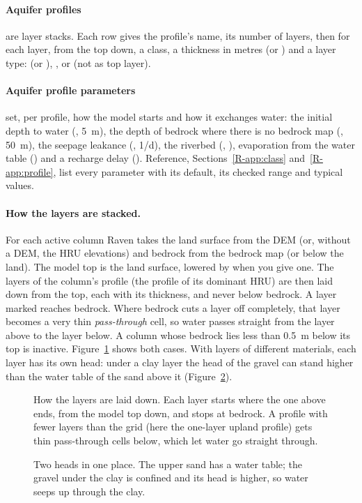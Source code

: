 \paragraph{Aquifer profiles} are layer stacks. Each row gives the profile's name, its number of layers, then for each
layer, from the top down, a class, a thickness in metres (or ) and a layer type:  (or
), ,  or  (not as top layer).

\paragraph{Aquifer profile parameters} set, per profile, how the model starts and how it exchanges water: the initial
depth to water (, 5~m), the depth of bedrock where there is no bedrock map
(, 50~m), the seepage leakance (, 1/d), the riverbed
(, ), evaporation from the water table () and a recharge
delay (). Reference, Sections~\ref{R-app:class} and~\ref{R-app:profile}, list every parameter
with its default, its checked range and typical values.

\paragraph{How the layers are stacked.} For each active column Raven takes the land surface from the DEM (or, without a
DEM, the HRU elevations) and bedrock from the bedrock map (or  below the land). The model top
is the land surface, lowered by  when you give one. The layers of the column's profile (the
profile of its dominant HRU) are then laid down from the top, each with its thickness, and never below bedrock. A layer
marked  reaches bedrock. Where bedrock cuts a layer off completely, that layer becomes a very thin
\emph{pass-through} cell, so water passes straight from the layer above to the layer below. A column whose bedrock lies
less than 0.5~m below its top is inactive.
Figure~\ref{fig:ulayers} shows both cases. With layers of different materials, each layer has its own head: under a
clay layer the head of the gravel can stand higher than the water table of the sand above it (Figure~\ref{fig:upotsurf}).
\begin{figure}[!htbp]\centering

\caption{How the layers are laid down. Each layer starts where the one above ends, from the model top down, and stops at bedrock. A profile with fewer layers than the grid (here the one-layer upland profile) gets thin pass-through cells below, which let water go straight through.}\label{fig:ulayers}
\end{figure}
\begin{figure}[!htbp]\centering

\caption{Two heads in one place. The upper sand has a water table; the gravel under the clay is confined and its head is higher, so water seeps up through the clay.}\label{fig:upotsurf}
\end{figure}

